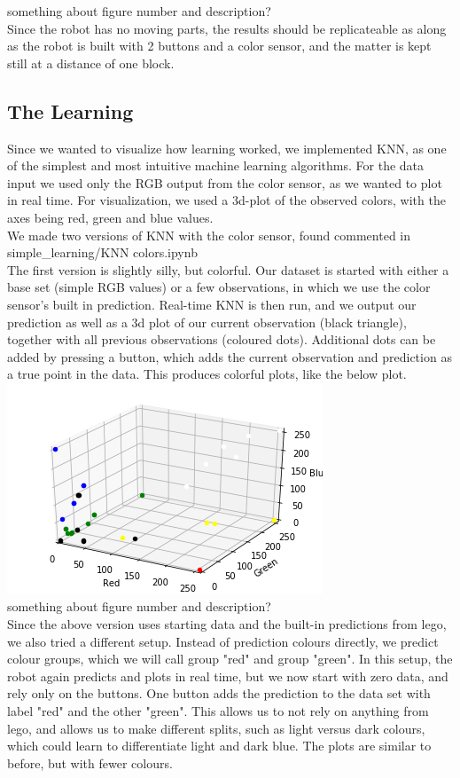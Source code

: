 \documentclass[11pt, a4paper]{article}
\begin{document}
something about figure number and description? \\
Since the robot has no moving parts, the results should be replicateable as along as the robot is built with 2 buttons and a color sensor, and the matter is kept still at a distance of one block.
\subsection{The Learning}
Since we wanted to visualize how learning worked, we implemented KNN, as one of the simplest and most intuitive machine learning algorithms. For the data input we used only the RGB output from the color sensor, as we wanted to plot in real time. For visualization, we used a 3d-plot of the observed colors, with the axes being red, green and blue values. \\
We made two versions of KNN with the color sensor, found commented in simple\_learning/KNN colors.ipynb \\
The first version is slightly silly, but colorful. Our dataset is started with either a base set (simple RGB values) or a few observations, in which we use the color sensor's built in prediction. Real-time KNN is then run, and we output our prediction as well as a 3d plot of our current observation (black triangle), together with all previous observations (coloured dots). Additional dots can be added by pressing a button, which adds the current observation and prediction as a true point in the data. This produces colorful plots, like the below plot. \\
\includegraphics[scale=1]{images/ColourKNNversion1.png} \\
something about figure number and description? \\
Since the above version uses starting data and the built-in predictions from lego, we also tried a different setup. Instead of prediction colours directly, we predict colour groups, which we will call group "red" and group "green". In this setup, the robot again predicts and plots in real time, but we now start with zero data, and rely only on the buttons. One button adds the prediction to the data set with label "red" and the other "green". This allows us to not rely on anything from lego, and allows us to make different splits, such as light versus dark colours, which could learn to differentiate light and dark blue. The plots are similar to before, but with fewer colours.\\
\end{document}
